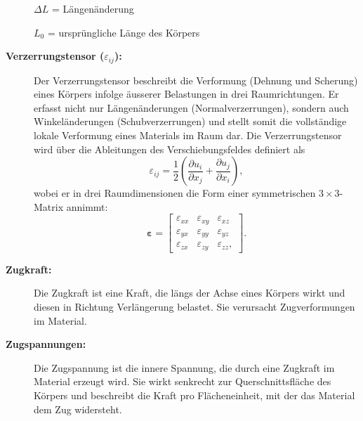 \begin{description}
	$\Delta L$ = Längenänderung
	
	$L_0$ = ursprüngliche Länge des Körpers
	
\item[\textbf{Verzerrungstensor ($\varepsilon_{ij}$):}]
Der Verzerrungstensor beschreibt die Verformung (Dehnung und Scherung)
eines Körpers infolge äusserer Belastungen in drei Raumrichtungen.
%
Er erfasst nicht nur Längenänderungen (Normalverzerrungen), sondern
auch Winkeländerungen (Schubverzerrungen) und stellt somit die
%
vollständige lokale Verformung eines Materials im Raum dar.
Die Verzerrungstensor wird über die Ableitungen des Verschiebungsfeldes
definiert als
	\begin{equation*}
		\varepsilon_{ij} = 
		\frac{1}{2} \left( \frac{\partial u_i}{\partial x_j} + \frac{\partial u_j}{\partial x_i} \right),
	\end{equation*}
	wobei er in drei Raumdimensionen die Form einer symmetrischen
	$3\times 3$-Matrix annimmt:
	\begin{equation*}
		\boldsymbol{\varepsilon} =
		\begin{bmatrix}
			\varepsilon_{xx} & \varepsilon_{xy} & \varepsilon_{xz} \\
			\varepsilon_{yx} & \varepsilon_{yy} & \varepsilon_{yz} \\
			\varepsilon_{zx} & \varepsilon_{zy} & \varepsilon_{zz},
		\end{bmatrix}.
	\end{equation*}
\item[\textbf{Zugkraft:}]
Die Zugkraft ist eine Kraft, die längs der Achse eines Körpers wirkt
%
und diesen in Richtung Verlängerung belastet.
Sie verursacht Zugverformungen im Material.
%
	
\item[\textbf{Zugspannungen:}]
Die Zugspannung ist die innere Spannung, die durch eine Zugkraft
%
im Material erzeugt wird.
Sie wirkt senkrecht zur Querschnittsfläche des Körpers und beschreibt
die Kraft pro Flächeneinheit, mit der das Material dem Zug widersteht.
\end{description}

